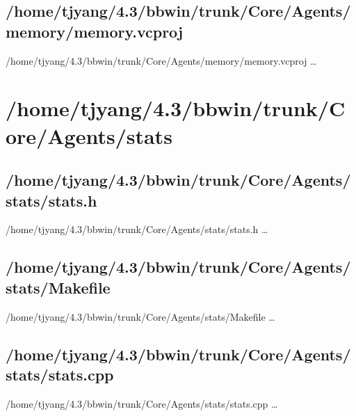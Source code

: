 \subsection{/home/tjyang/4.3/bbwin/trunk/Core/Agents/memory/memory.vcproj}
\lstset{numberstyle=\tiny,numbers=left,
   breaklines=true,
   stepnumber=1,numbersep=5pt,firstnumber=1,
   xleftmargin=12pt,showstringspaces=false}
\noindent /home/tjyang/4.3/bbwin/trunk/Core/Agents/memory/memory.vcproj  \ldots





\section{/home/tjyang/4.3/bbwin/trunk/Core/Agents/stats}

\subsection{/home/tjyang/4.3/bbwin/trunk/Core/Agents/stats/stats.h}
\lstset{numberstyle=\tiny,numbers=left,
   breaklines=true,
   stepnumber=1,numbersep=5pt,firstnumber=1,
   xleftmargin=12pt,showstringspaces=false}
\noindent /home/tjyang/4.3/bbwin/trunk/Core/Agents/stats/stats.h  \ldots



\subsection{/home/tjyang/4.3/bbwin/trunk/Core/Agents/stats/Makefile}
\lstset{numberstyle=\tiny,numbers=left,
   breaklines=true,
   stepnumber=1,numbersep=5pt,firstnumber=1,
   xleftmargin=12pt,showstringspaces=false}
\noindent /home/tjyang/4.3/bbwin/trunk/Core/Agents/stats/Makefile  \ldots



\subsection{/home/tjyang/4.3/bbwin/trunk/Core/Agents/stats/stats.cpp}
\lstset{numberstyle=\tiny,numbers=left,
   breaklines=true,
   stepnumber=1,numbersep=5pt,firstnumber=1,
   xleftmargin=12pt,showstringspaces=false}
\noindent /home/tjyang/4.3/bbwin/trunk/Core/Agents/stats/stats.cpp  \ldots




